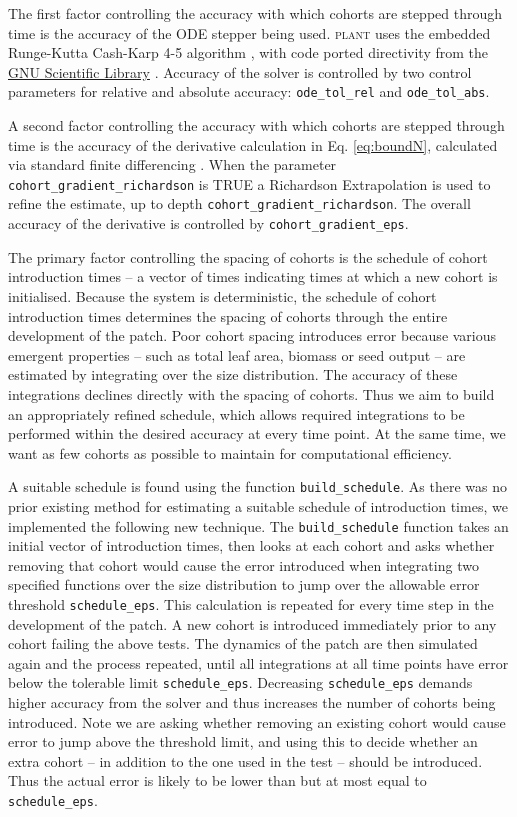 \documentclass[10pt,twoside]{article}
\newcommand{\plant}{\textsc{plant}}
\begin{document}
The first factor controlling the accuracy with which cohorts are stepped
through time is the accuracy of the ODE stepper being used. {\plant} uses
the embedded Runge-Kutta Cash-Karp 4-5 algorithm \citep{Cash-1990}, with
code ported directivity from the
\href{http://www.gnu.org/software/gsl/}{GNU Scientific Library}
\citep{Galassi-2009}. Accuracy of the solver is controlled by two
control parameters for relative and absolute accuracy:
\texttt{ode\_tol\_rel} and \texttt{ode\_tol\_abs}.

A second factor controlling the accuracy with which cohorts are stepped
through time is the accuracy of the derivative calculation in Eq.
\ref{eq:boundN}, calculated via standard finite differencing
\citep{Abramowitz-2012}. When the parameter
\texttt{cohort\_gradient\_richardson} is TRUE a Richardson Extrapolation
\citep{Stoer-2002} is used to refine the estimate, up to depth
\texttt{cohort\_gradient\_richardson}. The overall accuracy of the
derivative is controlled by \texttt{cohort\_gradient\_eps}.

The primary factor controlling the spacing of cohorts is the schedule of
cohort introduction times -- a vector of times indicating times at which
a new cohort is initialised. Because the system is deterministic, the
schedule of cohort introduction times determines the spacing of cohorts
through the entire development of the patch. Poor cohort spacing
introduces error because various emergent properties -- such as total
leaf area, biomass or seed output -- are estimated by integrating over
the size distribution. The accuracy of these integrations declines
directly with the spacing of cohorts. Thus we aim to build an
appropriately refined schedule, which allows required integrations to be
performed within the desired accuracy at every time point. At the same
time, we want as few cohorts as possible to maintain for computational
efficiency.

A suitable schedule is found using the function
\texttt{build\_schedule}. As there was no prior existing method for
estimating a suitable schedule of introduction times, we implemented the
following new technique. The \texttt{build\_schedule} function takes an
initial vector of introduction times, then looks at each cohort and asks
whether removing that cohort would cause the error introduced when
integrating two specified functions over the size distribution to jump
over the allowable error threshold \texttt{schedule\_eps}. This
calculation is repeated for every time step in the development of the
patch. A new cohort is introduced immediately prior to any cohort
failing the above tests. The dynamics of the patch are
then simulated again and the process repeated, until all integrations at
all time points have error below the tolerable limit
\texttt{schedule\_eps}. Decreasing \texttt{schedule\_eps} demands higher
accuracy from the solver and thus increases the number of cohorts being
introduced. Note we are asking whether removing an existing cohort would
cause error to jump above the threshold limit, and using this to decide
whether an extra cohort -- in addition to the one used in the test --
should be introduced. Thus the actual error is likely to
be lower than but at most equal to \texttt{schedule\_eps}.
\end{document}
